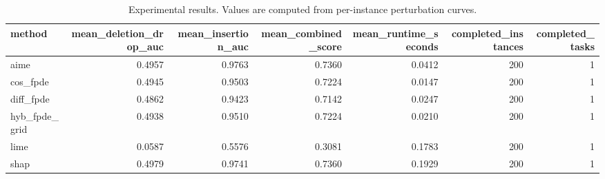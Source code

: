 \begin{table}[t]
\caption{Experimental results. Values are computed from per-instance perturbation curves.}
\label{tab:main_results_computed}
\centering
\begin{tabular}{lrrrrrr}
\toprule
method & mean\_deletion\_drop\_auc & mean\_insertion\_auc & mean\_combined\_score & mean\_runtime\_seconds & completed\_instances & completed\_tasks \\
\midrule
aime & 0.4957 & 0.9763 & 0.7360 & 0.0412 & 200 & 1 \\
cos\_fpde & 0.4945 & 0.9503 & 0.7224 & 0.0147 & 200 & 1 \\
diff\_fpde & 0.4862 & 0.9423 & 0.7142 & 0.0247 & 200 & 1 \\
hyb\_fpde\_grid & 0.4938 & 0.9510 & 0.7224 & 0.0210 & 200 & 1 \\
lime & 0.0587 & 0.5576 & 0.3081 & 0.1783 & 200 & 1 \\
shap & 0.4979 & 0.9741 & 0.7360 & 0.1929 & 200 & 1 \\
\bottomrule
\end{tabular}

\end{table}
